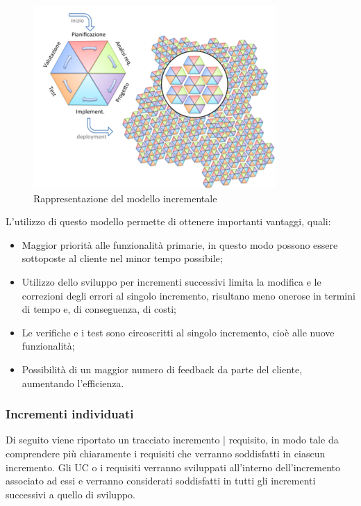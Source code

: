 \documentclass[../piano_di_progetto.tex]{subfiles}
\begin{document}
\begin{figure}[H]
    \centering
    \includegraphics[scale = 0.6]{src/img/modello_incrementale.png}
    \caption{Rappresentazione del modello incrementale}
    \label{fig:logo}
\end{figure}

L'utilizzo di questo modello permette di ottenere importanti vantaggi, quali:
\begin{itemize}
    \item Maggior priorità alle funzionalità primarie, in questo modo possono essere sottoposte al cliente nel minor tempo possibile;
    \item Utilizzo dello sviluppo per incrementi successivi limita la modifica e le correzioni degli errori al singolo incremento, risultano meno onerose in termini di tempo e, di conseguenza, di costi;
    \item Le verifiche e i test sono circoscritti al singolo incremento, cioè alle nuove funzionalità;
    \item Possibilità di un maggior numero di feedback da parte del cliente, aumentando l'efficienza.
\end{itemize}


\subsubsection{Incrementi individuati}
\label{ssub:incr_ind}

Di seguito viene riportato un tracciato incremento | requisito, in modo tale da comprendere più chiaramente i requisiti che verranno soddisfatti in ciascun incremento. 
Gli UC o i requisiti verranno sviluppati all'interno dell'incremento associato ad essi e verranno considerati soddisfatti in tutti gli incrementi successivi a quello di sviluppo.
\end{document}
